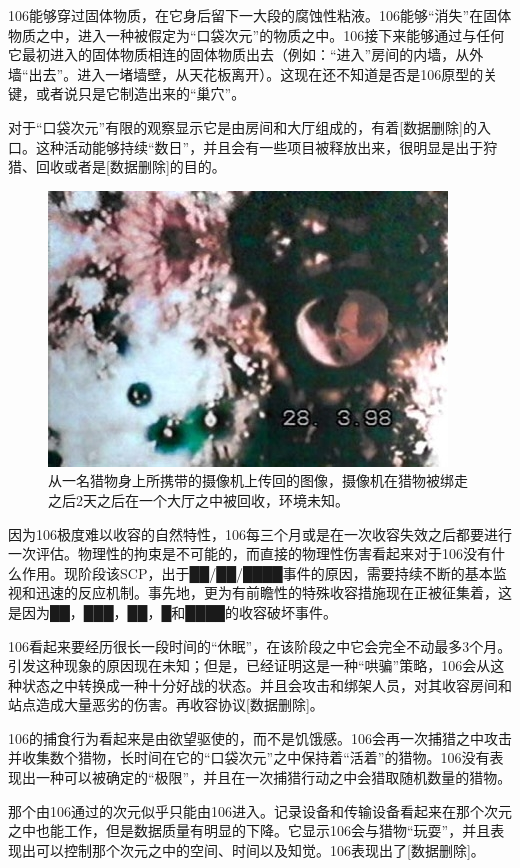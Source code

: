 106能够穿过固体物质，在它身后留下一大段的腐蚀性粘液。106能够“消失”在固体物质之中，进入一种被假定为“口袋次元”的物质之中。106接下来能够通过与任何它最初进入的固体物质相连的固体物质出去（例如：“进入”房间的内墙，从外墙“出去”。进入一堵墙壁，从天花板离开）。这现在还不知道是否是106原型的关键，或者说只是它制造出来的“巢穴”。

对于“口袋次元”有限的观察显示它是由房间和大厅组成的，有着{[}数据删除]的入口。这种活动能够持续“数日”，并且会有一些项目被释放出来，很明显是出于狩猎、回收或者是{[}数据删除]的目的。

\begin{figure}[H]
    \centering
    \includegraphics[width=0.5\linewidth]{images/SCP.106.3.jpg}
    \caption*{从一名猎物身上所携带的摄像机上传回的图像，摄像机在猎物被绑走之后2天之后在一个大厅之中被回收，环境未知。}
\end{figure}

\hr



因为106极度难以收容的自然特性，106每三个月或是在一次收容失效之后都要进行一次评估。物理性的拘束是不可能的，而直接的物理性伤害看起来对于106没有什么作用。现阶段该SCP，出于██\slash ██\slash ████事件的原因，需要持续不断的基本监视和迅速的反应机制。事先地，更为有前瞻性的特殊收容措施现在正被征集着，这是因为██，███，██，█和████的收容破坏事件。


106看起来要经历很长一段时间的“休眠”，在该阶段之中它会完全不动最多3个月。引发这种现象的原因现在未知；但是，已经证明这是一种“哄骗”策略，106会从这种状态之中转换成一种十分好战的状态。并且会攻击和绑架人员，对其收容房间和站点造成大量恶劣的伤害。再收容协议{[}数据删除]。

106的捕食行为看起来是由欲望驱使的，而不是饥饿感。106会再一次捕猎之中攻击并收集数个猎物，长时间在它的“口袋次元”之中保持着“活着”的猎物。106没有表现出一种可以被确定的“极限”，并且在一次捕猎行动之中会猎取随机数量的猎物。

那个由106通过的次元似乎只能由106进入。记录设备和传输设备看起来在那个次元之中也能工作，但是数据质量有明显的下降。它显示106会与猎物“玩耍”，并且表现出可以控制那个次元之中的空间、时间以及知觉。106表现出了{[}数据删除]。

